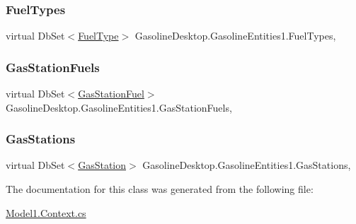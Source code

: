 \subsubsection{\texorpdfstring{FuelTypes}{FuelTypes}}
{\footnotesize\ttfamily virtual Db\+Set$<$\mbox{\hyperlink{class_gasoline_desktop_1_1_fuel_type}{Fuel\+Type}}$>$ Gasoline\+Desktop.\+Gasoline\+Entities1.\+Fuel\+Types\hspace{0.3cm}{\ttfamily [get]}, {\ttfamily [set]}}

\mbox{\label{class_gasoline_desktop_1_1_gasoline_entities1_a6737cc16941ef917417d1e569e4c8af3}} 
\subsubsection{\texorpdfstring{GasStationFuels}{GasStationFuels}}
{\footnotesize\ttfamily virtual Db\+Set$<$\mbox{\hyperlink{class_gasoline_desktop_1_1_gas_station_fuel}{Gas\+Station\+Fuel}}$>$ Gasoline\+Desktop.\+Gasoline\+Entities1.\+Gas\+Station\+Fuels\hspace{0.3cm}{\ttfamily [get]}, {\ttfamily [set]}}

\mbox{\label{class_gasoline_desktop_1_1_gasoline_entities1_ab83012308cfb0a8b705e3119d2d2cf9f}} 
\subsubsection{\texorpdfstring{GasStations}{GasStations}}
{\footnotesize\ttfamily virtual Db\+Set$<$\mbox{\hyperlink{class_gasoline_desktop_1_1_gas_station}{Gas\+Station}}$>$ Gasoline\+Desktop.\+Gasoline\+Entities1.\+Gas\+Stations\hspace{0.3cm}{\ttfamily [get]}, {\ttfamily [set]}}



The documentation for this class was generated from the following file\+:\begin{DoxyCompactItemize}
\item 
\mbox{\hyperlink{_model1_8_context_8cs}{Model1.\+Context.\+cs}}\end{DoxyCompactItemize}
